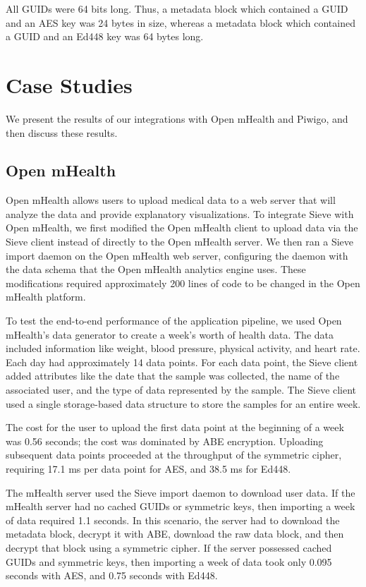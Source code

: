 All GUIDs were 64 bits long. Thus, a metadata
block which contained a GUID and an AES key
was 24 bytes in size, whereas a metadata block
which contained a GUID and an Ed448 key was
64 bytes long.


\section{Case Studies}
\label{sec:integration}
We present the results of our integrations
with Open mHealth and Piwigo, and then discuss
these results.

\subsection{Open mHealth} 
Open mHealth allows
users to upload medical data to a web server
that will analyze the data and provide
explanatory visualizations. To integrate Sieve
with Open mHealth, we first modified the Open
mHealth client to upload data via the Sieve
client instead of directly to the Open mHealth
server. We then ran a Sieve import daemon on
the Open mHealth web server, configuring the
daemon with the data schema that the Open mHealth
analytics engine uses. These modifications
required approximately 200 lines of code
to be changed in the Open mHealth platform.

To test the end-to-end performance of the
application pipeline, we used Open mHealth's
data generator to create a week's worth of
health data. The data included information
like weight, blood pressure, physical activity,
and heart rate. Each day had approximately
14 data points. For each data point, the
Sieve client added attributes like the
date that the sample was collected, the
name of the associated user, and the type
of data represented by the sample. The Sieve
client used a single storage-based data 
structure to store the samples for an entire week.

The cost for the user to upload the first data point
at the beginning of a week was 0.56 seconds;
the cost was dominated by ABE encryption.
Uploading subsequent data points proceeded
at the throughput of the symmetric cipher,
requiring 17.1 ms per data point for AES,
and 38.5 ms for Ed448.

The mHealth server used the Sieve import daemon
to download user data. If the mHealth server
had no cached GUIDs or symmetric keys, then
importing a week of data required 1.1 seconds.
In this scenario, the server had to download
the metadata block, decrypt it with ABE,
download the raw data block, and then decrypt
that block using a symmetric cipher. If the
server possessed cached GUIDs and symmetric keys,
then importing a week of data took only 0.095
seconds with AES, and 0.75 seconds with Ed448.


